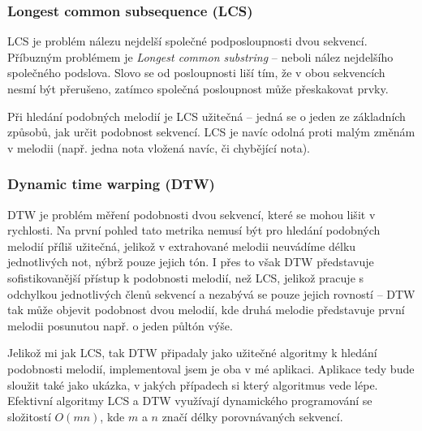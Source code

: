\subsubsection*{Longest common subsequence (LCS)}
LCS je problém nálezu nejdelší společné podposloupnosti dvou sekvencí. Příbuzným problémem je \textit{Longest common substring} -- neboli nález nejdelšího společného podslova. Slovo se od posloupnosti liší tím, že v obou sekvencích nesmí být přerušeno, zatímco společná posloupnost může přeskakovat prvky.

Při hledání podobných melodií je LCS užitečná -- jedná se o jeden ze základních způsobů, jak určit podobnost sekvencí. LCS je navíc odolná proti malým změnám v melodii (např. jedna nota vložená navíc, či chybějící nota).

\subsubsection*{Dynamic time warping (DTW)}
DTW je problém měření podobnosti dvou sekvencí, které se mohou lišit v rychlosti. Na první pohled tato metrika nemusí být pro hledání podobných melodií příliš užitečná, jelikož v extrahované melodii neuvádíme délku jednotlivých not, nýbrž pouze jejich tón. I přes to však DTW představuje sofistikovanější přístup k podobnosti melodií, než LCS, jelikož pracuje s odchylkou jednotlivých členů sekvencí a nezabývá se pouze jejich rovností -- DTW tak může objevit podobnost dvou melodií, kde druhá melodie představuje první melodii posunutou např. o jeden půltón výše.

Jelikož mi jak LCS, tak DTW připadaly jako užitečné algoritmy k hledání podobnosti melodií, implementoval jsem je oba v mé aplikaci. Aplikace tedy bude sloužit také jako ukázka, v jakých případech si který algoritmus vede lépe. Efektivní algoritmy LCS a DTW využívají dynamického programování se složitostí $O(mn)$, kde $m$ a $n$ značí délky porovnávaných sekvencí.
\pagebreak